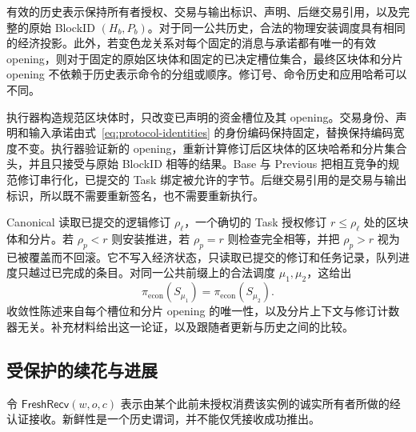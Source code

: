 \begin{lemma}[身份保持与安装无关性]
\label{lem:security-installation}
有效的历史表示保持所有者授权、交易与输出标识、声明、后继交易引用，以及完整的原始 BlockID $(H_b,P_b)$。对于同一公共历史，合法的物理安装调度具有相同的经济投影。此外，若变色龙关系对每个固定的消息与承诺都有唯一的有效 opening，则对于固定的原始区块体和固定的已决定槽位集合，最终区块体和分片 opening 不依赖于历史表示命令的分组或顺序。修订号、命令历史和应用哈希可以不同。
\end{lemma}
\begin{IEEEproof}
执行器构造规范区块体时，只改变已声明的资金槽位及其 opening。交易身份、声明和输入承诺由式~\eqref{eq:protocol-identities} 的身份编码保持固定，替换保持编码宽度不变。执行器验证新的 opening，重新计算修订后区块体的区块哈希和分片集合头，并且只接受与原始 BlockID 相等的结果。Base 与 Previous 把相互竞争的规范修订串行化，已提交的 Task 绑定被允许的字节。后继交易引用的是交易与输出标识，所以既不需要重新签名，也不需要重新执行。

Canonical 读取已提交的逻辑修订 $\rho_\ell$，一个确切的 Task 授权修订 $r\le\rho_\ell$ 处的区块体和分片。若 $\rho_p<r$ 则安装推进，若 $\rho_p=r$ 则检查完全相等，并把 $\rho_p>r$ 视为已被覆盖而不回滚。它不写入经济状态，只读取已提交的修订和任务记录，队列进度只越过已完成的条目。对同一公共前缀上的合法调度 $\mu_1,\mu_2$，这给出
\begin{equation}
 \pi_{\mathrm{econ}}(S_{\mu_1})=\pi_{\mathrm{econ}}(S_{\mu_2}).
 \label{eq:security-installation}
\end{equation}
收敛性陈述来自每个槽位和分片 opening 的唯一性，以及分片上下文与修订计数器无关。补充材料给出这一论证，以及跟随者更新与历史之间的比较。
\end{IEEEproof}

\subsection{受保护的续花与进展}
\label{sec:security-composition}

令 $\mathsf{FreshRecv}(w,o,c)$ 表示由某个此前未授权消费该实例的诚实所有者所做的经认证接收。新鲜性是一个历史谓词，并不能仅凭接收成功推出。

